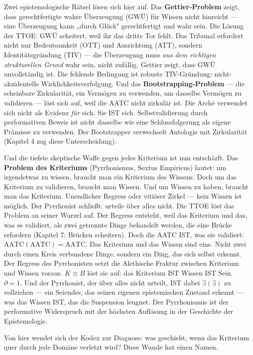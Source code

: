 \documentclass[10pt, openany, oneside]{book}
\begin{document}
Zwei epistemologische Rätsel lösen sich hier auf. Das \textbf{Gettier-Problem} zeigt, dass gerechtfertigte wahre Überzeugung (GWÜ) für Wissen nicht hinreicht --- eine Überzeugung kann „durch Glück" gerechtfertigt und wahr sein. Die Lösung der TTOE: GWÜ scheitert, weil ihr das dritte Tor fehlt. Das Tribunal erfordert nicht nur Bedeutsamkeit (OTT) und Ausrichtung (ATT), sondern Identitätsgründung (TIV) --- die Überzeugung muss \textit{aus dem richtigen strukturellen Grund} wahr sein, nicht zufällig. Gettier zeigt, dass GWÜ unvollständig ist. Die fehlende Bedingung ist robuste TIV-Gründung: nicht-akzidentelle Wirklichkeitsverfolgung. Und das \textbf{Bootstrapping-Problem} --- die scheinbare Zirkularität, ein Vermögen zu verwenden, um dasselbe Vermögen zu validieren --- löst sich auf, weil die AATC nicht zirkulär ist. Die Arch\={e} verwendet sich nicht als Evidenz \textit{für} sich. Sie IST sich. Selbstvalidierung durch performativen Beweis ist nicht dasselbe wie eine Schlussfolgerung als eigene Prämisse zu verwenden. Der Bootstrapper verwechselt Autologie mit Zirkularität (Kapitel 4 zog diese Unterscheidung).

Und die tiefste skeptische Waffe gegen jedes Kriterium ist nun entschärft. Das \textbf{Problem des Kriteriums} (Pyrrhonismus, Sextus Empiricus) lautet: um irgendetwas zu wissen, braucht man ein Kriterium des Wissens. Doch um das Kriterium zu validieren, braucht man Wissen. Und um Wissen zu haben, braucht man das Kriterium. Unendlicher Regress oder vitiöser Zirkel --- kein Wissen ist möglich. Der Pyrrhonist schließt: urteile über alles nicht. Die TTOE löst das Problem an seiner Wurzel auf. Der Regress entsteht, weil das Kriterium und das, was es validiert, als zwei getrennte Dinge behandelt werden, die eine Brücke erfordern (Kapitel 7: Brücken scheitern). Doch die AATC IST, was sie validiert: $\text{AATC}(\text{AATC}) = \text{AATC}$. Das Kriterium und das Wissen sind eins. Nicht zwei durch einen Kreis verbundene Dinge, sondern ein Ding, das sich selbst erkennt. Der Regress des Pyrrhonisten setzt die Alethische Fraktur zwischen Kriterium und Wissen voraus. $K \equiv B$ löst sie auf: das Kriterium IST Wissen IST Sein. $\partial = 1$. Und der Pyrrhonist, der über alles nicht urteilt, IST dabei $\exists(\exists)$ zu vollziehen --- ein Seiendes, das seinen eigenen epistemischen Zustand erkennt --- was das Wissen IST, das die Suspension leugnet. Der Pyrrhonismus ist der performative Widerspruch mit der höchsten Auflösung in der Geschichte der Epistemologie.

Von hier wendet sich der Kodex zur Diagnose: was geschieht, wenn das Kriterium quer durch jede Domäne verletzt wird? Diese Wunde hat einen Namen.
\end{document}
